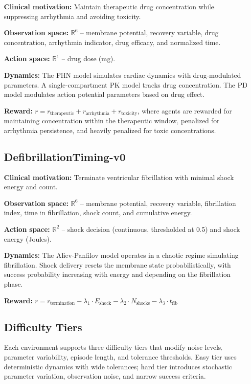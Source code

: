 \documentclass[11pt,a4paper]{article}
\begin{document}
\textbf{Clinical motivation:} Maintain therapeutic drug concentration while suppressing arrhythmia and avoiding toxicity.

\textbf{Observation space:} $\mathbb{R}^6$ -- membrane potential, recovery variable, drug concentration, arrhythmia indicator, drug efficacy, and normalized time.

\textbf{Action space:} $\mathbb{R}^1$ -- drug dose (mg).

\textbf{Dynamics:} The FHN model simulates cardiac dynamics with drug-modulated parameters. A single-compartment PK model tracks drug concentration. The PD model modulates action potential parameters based on drug effect.

\textbf{Reward:} $r = r_{\text{therapeutic}} + r_{\text{arrhythmia}} + r_{\text{toxicity}}$, where agents are rewarded for maintaining concentration within the therapeutic window, penalized for arrhythmia persistence, and heavily penalized for toxic concentrations.

\subsection{DefibrillationTiming-v0}

\textbf{Clinical motivation:} Terminate ventricular fibrillation with minimal shock energy and count.

\textbf{Observation space:} $\mathbb{R}^6$ -- membrane potential, recovery variable, fibrillation index, time in fibrillation, shock count, and cumulative energy.

\textbf{Action space:} $\mathbb{R}^2$ -- shock decision (continuous, thresholded at 0.5) and shock energy (Joules).

\textbf{Dynamics:} The Aliev-Panfilov model operates in a chaotic regime simulating fibrillation. Shock delivery resets the membrane state probabilistically, with success probability increasing with energy and depending on the fibrillation phase.

\textbf{Reward:} $r = r_{\text{termination}} - \lambda_1 \cdot E_{\text{shock}} - \lambda_2 \cdot N_{\text{shocks}} - \lambda_3 \cdot t_{\text{fib}}$

\subsection{Difficulty Tiers}

Each environment supports three difficulty tiers that modify noise levels, parameter variability, episode length, and tolerance thresholds. Easy tier uses deterministic dynamics with wide tolerances; hard tier introduces stochastic parameter variation, observation noise, and narrow success criteria.
\end{document}
